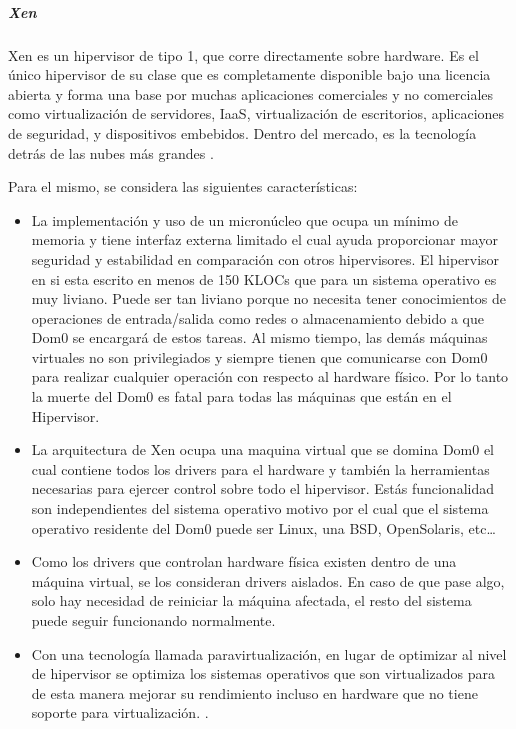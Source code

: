 \subparagraph{Xen}
Xen es un hipervisor de tipo 1, que corre directamente sobre hardware. Es el único hipervisor de su clase que es completamente disponible bajo una licencia abierta y forma una base por muchas aplicaciones comerciales y no comerciales como virtualización de servidores, IaaS, virtualización de escritorios, aplicaciones de seguridad, y dispositivos embebidos. Dentro del mercado, es la tecnología detrás de las nubes más grandes \citep{Xen-Project-Overview}.
 
Para el mismo, se considera las siguientes características:
\begin{itemize}
	\item La implementación y uso de un micronúcleo que ocupa un mínimo de memoria y tiene interfaz externa limitado el cual ayuda proporcionar mayor seguridad y estabilidad en comparación con otros hipervisores. El hipervisor en si esta escrito en menos de 150 KLOCs que para un sistema operativo es muy liviano. Puede ser tan liviano porque no necesita tener conocimientos de operaciones de entrada/salida como redes o almacenamiento debido a que Dom0 se encargará de estos tareas. Al mismo tiempo, las demás máquinas virtuales no son privilegiados y siempre tienen que comunicarse con Dom0 para realizar cualquier operación con respecto al hardware físico. Por lo tanto la muerte del Dom0 es fatal para todas las máquinas que están en el Hipervisor.
    \item La arquitectura de Xen ocupa una maquina virtual que se domina Dom0 el cual contiene todos los drivers para el hardware y también la herramientas necesarias para ejercer control sobre todo el hipervisor. Estás funcionalidad son independientes del sistema operativo motivo por el cual que el sistema operativo residente del Dom0 puede ser Linux, una BSD, OpenSolaris, etc\ldots
    \item Como los drivers que controlan hardware física existen dentro de una máquina virtual, se los consideran drivers aislados. En caso de que pase algo, solo hay necesidad de reiniciar la máquina afectada, el resto del sistema puede seguir funcionando normalmente.
    \item Con una tecnología llamada paravirtualización, en lugar de optimizar al nivel de hipervisor se optimiza los sistemas operativos que son virtualizados para de esta manera mejorar su rendimiento incluso en hardware que no tiene soporte para virtualización. \citep{Xen-Project-Overview}.
\end{itemize}


